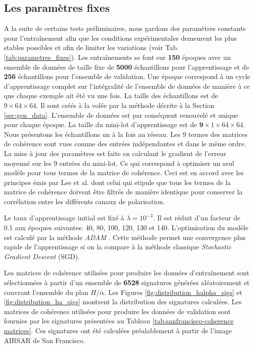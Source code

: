 \subsection{Les paramètres fixes}

A la suite de certains tests préliminaires, nous gardons des paramètres constants pour l'entraînement afin que les conditions expérimentales demeurent les plus stables possibles et afin de limiter les variations (voir Tab. \ref{tab:parametres_fixes}).  Les entraînements se font sur \textbf{150} époques avec un ensemble de données de taille fixe de  \textbf{5000} échantillons pour l'apprentissage et de  \textbf{256} échantillons pour l'ensemble de validation. Une époque correspond à un cycle d'apprentissage complet sur l'intégralité de l'ensemble de données de manière à ce que chaque exemple ait été vu une fois.  La taille des échantillons est de $9 \times 64 \times 64$. Il sont créés à la volée par la méthode décrite à la Section \ref{sec:gen_data}. L'ensemble de données est par conséquent renouvelé et unique pour chaque époque.  La taille du mini-lot d'apprentissage est de  $ \textbf{9} \times 1 \times 64 \times 64$.  Nous présentons les échantillons un à la fois au réseau. Les 9 termes des matrices de cohérence sont vues comme des entrées indépendantes et dans le même ordre.  La mise à jour des paramètres est faite en calculant le gradient de l'erreur moyenné sur les 9 entrées du mini-lot. Ce qui correspond à optimiser un seul modèle pour tous termes de la matrice de cohérence. Ceci est en accord avec les principes émis par Lee et al. \cite{Lee1999} dont celui qui stipule que tous les termes de la matrice de cohérence doivent être filtrés de manière identique pour conserver la corrélation entre les différents canaux de polarisation.

Le taux d'apprentissage initial est fixé à $\lambda=10^{-3}$. Il est réduit d'un facteur de 0.1 aux époques suivantes:  40, 80, 100, 120, 130 et 140.  L'optimisation du modèle est calculé par la méthode \textit{ADAM} \cite{Kingma2014AdamAM}.  Cette méthode permet une convergence plus rapide de l'apprentissage si on la compare à la méthode classique \textit{Stochastic Gradient Descent} (SGD).

Les matrices de cohérence \matcoh utilisées pour produire les données d'entraînement sont sélectionnées à partir d'un ensemble de \textbf{6528} signatures générées aléatoirement et couvrant l'ensemble du plan $H/\bar{\alpha}$.  Les Figures \ref{fig:distribution_halpha_sigs} et \ref{fig:distribution_ha_sigs} montrent la distribution des signatures calculées. Les matrices de cohérence \matcoh utilisées pour produire les données de validation sont fournies par les signatures présentées au Tableau \ref{tab:sanfrancisco-coherence matrices}. Ces signatures ont été calculées préalablement à partir de l'image AIRSAR de San Francisco.

